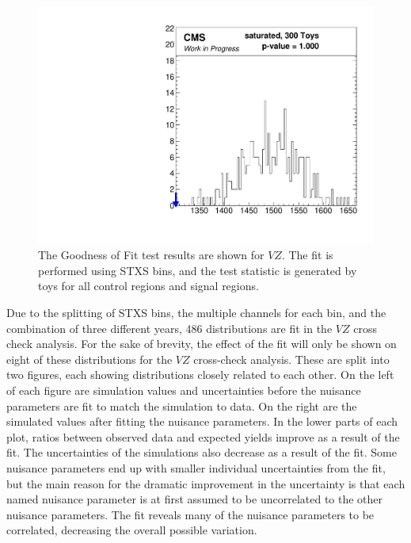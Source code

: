 \begin{figure}
  \centering
  \includegraphics[width=0.65\linewidth]{figures/210308_STXS_VZ_XbbVZ_e4179c95_inclusive_gof/Gof_inclusive_.pdf}
  \caption[Goodness of Fit for $V\!Z$]{
    The Goodness of Fit test results are shown for $V\!Z$.
    The fit is performed using STXS bins,
    and the test statistic is generated by toys for all control regions and signal regions.
  }
  \label{fig:vz-gof}
\end{figure}

Due to the splitting of STXS bins, the multiple channels for each bin, and the combination of three different years,
486 distributions are fit in the $V\!Z$ cross check analysis.
For the sake of brevity, the effect of the fit will only be shown on eight of these distributions for the $V\!Z$
cross-check analysis.
These are split into two figures, each showing distributions closely related to each other.
On the left of each figure are simulation values and uncertainties
before the nuisance parameters are fit to match the simulation to data.
On the right are the simulated values after fitting the nuisance parameters.
In the lower parts of each plot, ratios between observed data and expected yields improve as a result of the fit.
The uncertainties of the simulations also decrease as a result of the fit.
Some nuisance parameters end up with smaller individual uncertainties from the fit,
but the main reason for the dramatic improvement in the uncertainty is that each named nuisance parameter is at first
assumed to be uncorrelated to the other nuisance parameters.
The fit reveals many of the nuisance parameters to be correlated, decreasing the overall possible variation.

